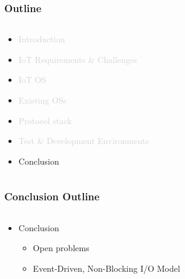 \documentclass{beamer}
\begin{document}
\begin{frame}
	\frametitle{Outline}
	\begin{columns}[c]
		\begin{column}{30cm}
			\vspace{.1cm}
			\begin{itemize}
				\justifying
				\item \textcolor{LightGray}{Introduction}
				\item \textcolor{LightGray}{IoT Requirements \& Challenges}
				\item \textcolor{LightGray}{IoT OS}
				\item \textcolor{LightGray}{Existing OSs}
				\item \textcolor{LightGray}{Protocol stack}
				\item \textcolor{LightGray}{Test \& Development Environments}
				\item Conclusion
			\end{itemize}
		\end{column}
	\end{columns}
\end{frame}

\begin{frame}
	\frametitle{Conclusion Outline}
	\begin{columns}[c]
		\begin{column}{30cm}
			\vspace{.1cm}
			\begin{itemize}
				\justifying
				\item Conclusion
				\begin{itemize}
					\item Open problems
					\item Event-Driven, Non-Blocking I/O Model
				\end{itemize}
			\end{itemize}
		\end{column}
	\end{columns}
\end{frame}
\end{document}
